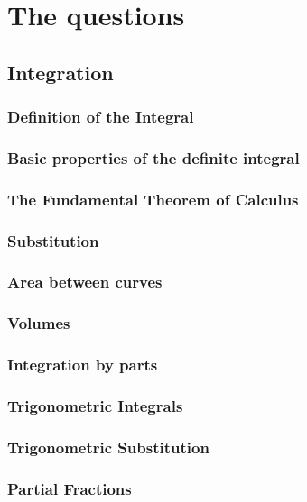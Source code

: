 \documentclass[12pt,letterpaper, openany]{book}
\begin{document}
\mainmatter

\part{The questions}


\chapter{Integration}
\section{Definition of the Integral}

\section{Basic properties of the definite integral}

\section{The Fundamental Theorem of Calculus}

\section{Substitution}

\section{Area between curves}

\section{Volumes}

\section{Integration by parts}

\section{Trigonometric Integrals}

\section{Trigonometric Substitution}

\section{Partial Fractions}

\end{document}
